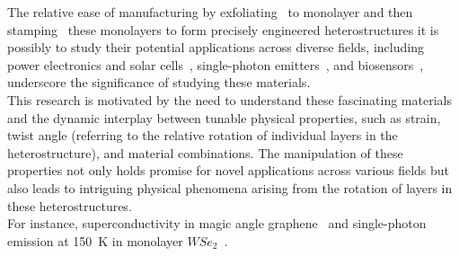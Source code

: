 The relative ease of manufacturing by exfoliating~\cite{bhushan2012encyclopedia,novoselovElectricFieldAtomically2004,kimLargescalePatternGrowth2009,deanBoronNitrideSubstrates2010a} to monolayer and then stamping~\cite{frisendaRecentProgressAssembly2018,castellanos-gomezDeterministicTransferTwodimensional2014} these monolayers to form precisely engineered heterostructures it is possibly to study their potential applications across diverse fields, including power electronics and solar cells~\cite{gongTwoStepGrowthTwoDimensional2015,liEpitaxialGrowthMonolayer2015,duanLateralEpitaxialGrowth2014,gongVerticalInplaneHeterostructures2014,hongUltrafastChargeTransfer2014}, single-photon emitters~\cite{koperskiSinglePhotonEmitters2015, rosenbergerQuantumCalligraphyWriting2019, pengCreationSinglePhotonEmitters2020}, and biosensors~\cite{loanGrapheneMoS2Heterostructures2014}, underscore the significance of studying these materials.\\

This research is motivated by the need to understand these fascinating materials and the dynamic interplay between tunable physical properties, such as strain, twist angle (referring to the relative rotation of individual layers in the heterostructure), and material combinations. The manipulation of these properties not only holds promise for novel applications across various fields but also leads to intriguing physical phenomena arising from the rotation of layers in these heterostructures.\\

For instance, superconductivity in magic angle graphene~\cite{caoUnconventionalSuperconductivityMagicangle2018} and single-photon emission at \SI{150}{\kelvin} in monolayer $WSe_2$~\cite{partoDefectStrainEngineering2021}.

